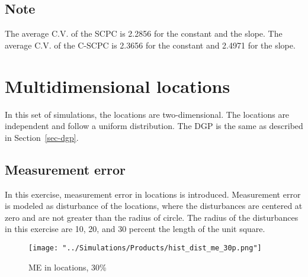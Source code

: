 \documentclass[
]{article}
\begin{document}
\hypertarget{note}{%
\subsection*{Note}\label{note}}

The average C.V. of the SCPC is 2.2856 for the constant and the slope.
The average C.V. of the C-SCPC is 2.3656 for the constant and 2.4971 for
the slope.

\hypertarget{sec-multi}{%
\section{Multidimensional locations}\label{sec-multi}}

In this set of simulations, the locations are two-dimensional. The
locations are independent and follow a uniform distribution. The DGP is
the same as described in Section~\ref{sec-dgp}.

\hypertarget{sec-me}{%
\subsection{Measurement error}\label{sec-me}}

In this exercise, measurement error in locations is introduced.
Measurement error is modeled as disturbance of the locations, where the
disturbances are centered at zero and are not greater than the radius of
circle. The radius of the disturbances in this exercise are 10, 20, and
30 percent the length of the unit square.

\begin{figure}

{\centering \texttt{[image: "../Simulations/Products/hist\_dist\_me\_30p.png"]}

}

\caption[Histogram of distances using true and mismeasured locations
when ME is 30 percent.]{\label{fig-loc-me}ME in locations, 30\%}

\end{figure}
\end{document}

